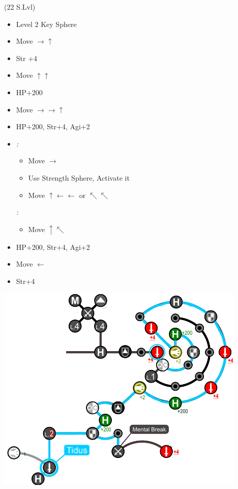 \begin{spheregrid}
	\begin{itemize}
		\tidusf (22 S.Lvl)
		\begin{itemize}
			\item Level 2 Key Sphere
			\item Move $\rightarrow\uparrow$
			\item Str +4
			\item Move $\uparrow\uparrow$
			\item HP+200
			\item Move $\rightarrow\rightarrow\uparrow$
			\item HP+200, Str+4, Agi+2
			\item \textit{\blitzwin:}
			      \begin{itemize}
				      \item Move $\rightarrow$
				      \item Use Strength Sphere, Activate it
				      \item Move $\uparrow\leftarrow\leftarrow$ or $\nwarrow\nwarrow$
			      \end{itemize}
			      \textit{\blitzloss:}
			      \begin{itemize}
				      \item Move $\uparrow\nwarrow$
			      \end{itemize}
			\item HP+200, Str+4, Agi+2
			\item Move $\leftarrow$
			\item Str+4
		\end{itemize}
		\includegraphics[width=.8\columnwidth]{graphics/Tidus_post_crawler}
	\end{itemize}
\end{spheregrid}
